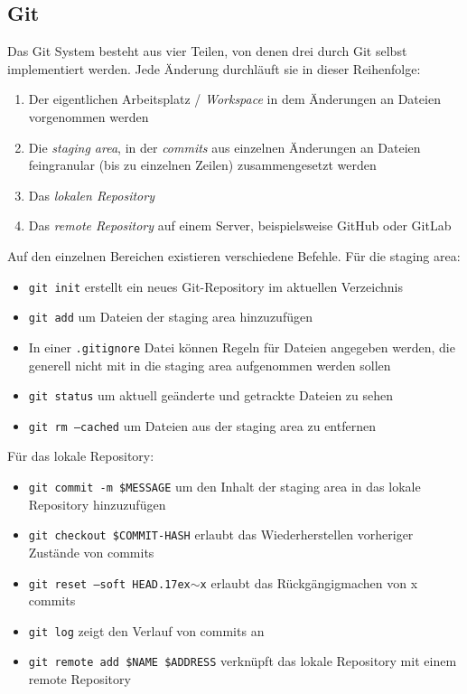 \documentclass[12pt,a4]{article}
\begin{document}
	\subsection{Git}
	Das Git System besteht aus vier Teilen, von denen drei durch Git selbst implementiert werden. Jede Änderung durchläuft sie in dieser Reihenfolge: 
	\begin{enumerate}
		\item Der eigentlichen Arbeitsplatz / \textit{Workspace} in dem Änderungen an Dateien vorgenommen werden
		\item Die \textit{staging area}, in der \textit{commits} aus einzelnen Änderungen an Dateien feingranular (bis zu einzelnen Zeilen) zusammengesetzt werden
		\item Das \textit{lokalen Repository}
		\item Das \textit{remote Repository} auf einem Server, beispielsweise GitHub oder GitLab
	\end{enumerate}
	Auf den einzelnen Bereichen existieren verschiedene Befehle. Für die staging area:
	\begin{itemize}
		\item \texttt{git init} erstellt ein neues Git-Repository im aktuellen Verzeichnis
		\item \texttt{git add} um Dateien der staging area hinzuzufügen
		\item In einer \texttt{.gitignore} Datei können Regeln für Dateien angegeben werden, die generell nicht mit in die staging area aufgenommen werden sollen
		\item \texttt{git status} um aktuell geänderte und getrackte Dateien zu sehen
		\item \texttt{git rm --cached} um Dateien aus der staging area zu entfernen
		
	\end{itemize}
	Für das lokale Repository:
	\begin{itemize}
		\item \texttt{git commit -m \$MESSAGE} um den Inhalt der staging area in das lokale Repository hinzuzufügen
		\item \texttt{git checkout \$COMMIT-HASH} erlaubt das Wiederherstellen vorheriger Zustände von commits
		\item \texttt{git reset --soft HEAD{\raise.17ex\hbox{$\scriptstyle\sim$}}x} erlaubt das Rückgängigmachen von x commits
		\item \texttt{git log} zeigt den Verlauf von commits an
		\item \texttt{git remote add \$NAME \$ADDRESS} verknüpft das lokale Repository mit einem remote Repository
	\end{itemize}
\end{document}
